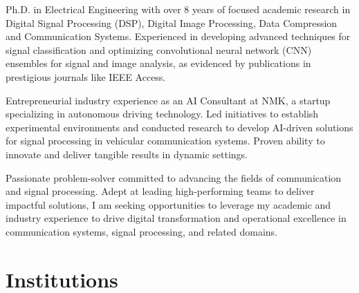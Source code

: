\documentclass[letterpaper,
		10pt]{article}
\begin{document}
%
%

\begin{itemize}
Ph.D. in Electrical Engineering with over 8 years of focused academic research in Digital Signal Processing (DSP), Digital Image Processing, Data Compression and Communication Systems. Experienced in developing advanced techniques for signal classification and optimizing convolutional neural network (CNN) ensembles for signal and image analysis, as evidenced by publications in prestigious journals like IEEE Access.

Entrepreneurial industry experience as an AI Consultant at NMK, a startup specializing in autonomous driving technology. Led initiatives to establish experimental environments and conducted research to develop AI-driven solutions for signal processing in vehicular communication systems. Proven ability to innovate and deliver tangible results in dynamic settings.

Passionate problem-solver committed to advancing the fields of communication and signal processing. Adept at leading high-performing teams to deliver impactful solutions, I am seeking opportunities to leverage my academic and industry experience to drive digital transformation and operational excellence in communication systems, signal processing, and related domains.

\end{itemize}
\section{Institutions}
\end{document}

